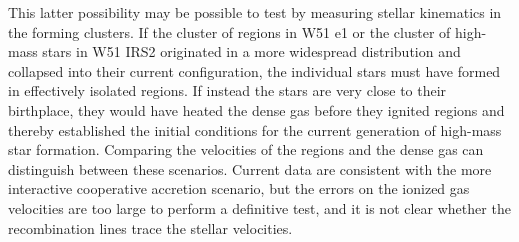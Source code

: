 \documentclass{emulateapj}
\begin{document}
This latter possibility may be possible to test by
measuring stellar kinematics in the forming clusters.  If the cluster of \hchii
regions in W51 e1 or the cluster of high-mass stars in W51 IRS2 originated in a
more widespread distribution and collapsed into their current configuration,
the individual stars must have formed in  effectively isolated regions.  If
instead the stars are very close to their birthplace, they would have heated the
dense gas before they ignited \hii regions and thereby established the initial
conditions for the current generation of high-mass star formation.  Comparing
the velocities of the \hii regions and the dense gas can distinguish
between these scenarios.  Current data \citep[i.e., H77$\alpha$ measurements
in][]{Ginsburg2016a} are consistent
with the more interactive cooperative accretion scenario, but the errors on the
ionized gas velocities are too large to perform a definitive test, and it is not
clear whether the recombination lines trace the stellar velocities.





\end{document}
